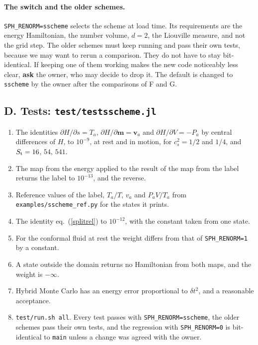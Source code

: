 \documentclass[11pt,aps,preprint,nofootinbib,superscriptaddress,tightenlines]{revtex4-2}
\def\Eq#1{eq.~(\ref{#1})}
\let\oldparagraph\paragraph
\renewcommand{\paragraph}{\par\bigskip\oldparagraph}
\begin{document}
\paragraph{The switch and the older schemes.}  \texttt{SPH\_RENORM=sscheme} selects the scheme at load time.  Its requirements are the energy
Hamiltonian, the number volume, $d=2$, the Liouville measure, and not the grid step.  The older schemes must keep running and pass their own tests,
because we may want to rerun a comparison.  They do not have to stay bit-identical.  If keeping one of them working makes the new code noticeably less
clear, \textbf{ask} the owner, who may decide to drop it.  The default is changed to \texttt{sscheme} by the owner after the comparisons of F and G.

\subsection{D. Tests: \texorpdfstring{\nolinkurl{test/testsscheme.jl}}{test/testsscheme.jl}}

\begin{enumerate}
\item The identities $\partial H/\partial s=T_a$, $\partial H/\partial\bm m=\bm v_a$ and $\partial H/\partial V=-P_a$ by central differences of $H$, to
  $10^{-9}$, at rest and in motion, for $c_s^2=1/2$ and $1/4$, and $S_{\rm t}=16$, $54$, $541$.
\item The map from the energy applied to the result of the map from the label returns the label to $10^{-13}$, and the reverse.
\item Reference values of the label, $T_a/T$, $v_a$ and $P_aV/T_a$ from \nolinkurl{examples/sscheme_ref.py} for the states it prints.
\item The identity \Eq{splitrel} to $10^{-12}$, with the constant taken from one state.
\item For the conformal fluid at rest the weight differs from that of \texttt{SPH\_RENORM=1} by a constant.
\item A state outside the domain returns no Hamiltonian from both maps, and the weight is $-\infty$.
\item Hybrid Monte Carlo has an energy error proportional to $\delta t^2$, and a reasonable acceptance.
\item \texttt{test/run.sh all}.  Every test passes with \texttt{SPH\_RENORM=sscheme}, the older schemes pass their own tests, and the regression with
  \texttt{SPH\_RENORM=0} is bit-identical to \texttt{main} unless a change was agreed with the owner.
\end{enumerate}
\end{document}
